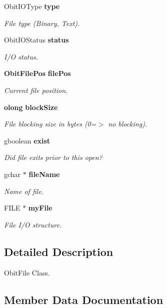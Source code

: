 \begin{CompactItemize}
Obit\-IOType {\bf type}
\begin{CompactList}\small\item\em File type (Binary, Text). \item\end{CompactList}\item 
Obit\-IOStatus {\bf status}
\begin{CompactList}\small\item\em I/O status. \item\end{CompactList}\item 
{\bf Obit\-File\-Pos} {\bf file\-Pos}
\begin{CompactList}\small\item\em Current file position. \item\end{CompactList}\item 
{\bf olong} {\bf block\-Size}
\begin{CompactList}\small\item\em File blocking size in bytes (0=$>$ no blocking). \item\end{CompactList}\item 
gboolean {\bf exist}
\begin{CompactList}\small\item\em Did file exits prior to this open? \item\end{CompactList}\item 
gchar $\ast$ {\bf file\-Name}
\begin{CompactList}\small\item\em Name of file. \item\end{CompactList}\item 
FILE $\ast$ {\bf my\-File}
\begin{CompactList}\small\item\em File I/O structure. \item\end{CompactList}\end{CompactItemize}


\subsection{Detailed Description}
Obit\-File Class. 



\subsection{Member Data Documentation}
